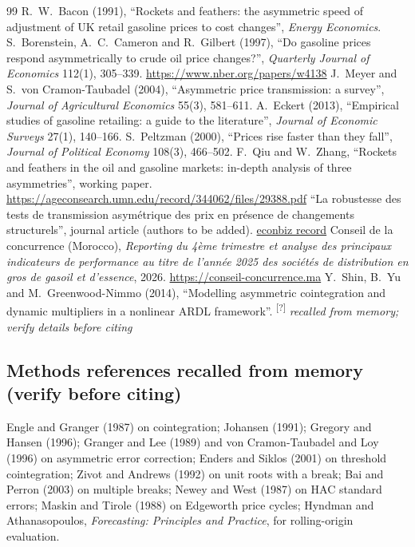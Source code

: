 \documentclass[11pt,a4paper]{article}
\theoremstyle{definition}
\begin{document}
\begin{thebibliography}{99}\small
{} R.~W.~Bacon (1991), ``Rockets and feathers: the asymmetric speed of adjustment of UK retail gasoline prices to cost changes'', \emph{Energy Economics}.
 S.~Borenstein, A.~C.~Cameron and R.~Gilbert (1997), ``Do gasoline prices respond asymmetrically to crude oil price changes?'', \emph{Quarterly Journal of Economics} 112(1), 305--339. \url{https://www.nber.org/papers/w4138}
 J.~Meyer and S.~von Cramon-Taubadel (2004), ``Asymmetric price transmission: a survey'', \emph{Journal of Agricultural Economics} 55(3), 581--611.
 A.~Eckert (2013), ``Empirical studies of gasoline retailing: a guide to the literature'', \emph{Journal of Economic Surveys} 27(1), 140--166.
 S.~Peltzman (2000), ``Prices rise faster than they fall'', \emph{Journal of Political Economy} 108(3), 466--502.
 F.~Qiu and W.~Zhang, ``Rockets and feathers in the oil and gasoline markets: in-depth analysis of three asymmetries'', working paper. \url{https://ageconsearch.umn.edu/record/344062/files/29388.pdf}
 ``La robustesse des tests de transmission asym\'etrique des prix en pr\'esence de changements structurels'', journal article (authors to be added). \href{https://www.econbiz.de/Record/la-robustesse-des-tests-de-transmission-asym%C3%A9trique-des-prix-en-pr%C3%A9sence-de-changements-structurels/10008604344}{econbiz record}
 Conseil de la concurrence (Morocco), \emph{Reporting du 4\`eme trimestre et analyse des principaux indicateurs de performance au titre de l'ann\'ee 2025 des soci\'et\'es de distribution en gros de gasoil et d'essence}, 2026. \url{https://conseil-concurrence.ma}
 Y.~Shin, B.~Yu and M.~Greenwood-Nimmo (2014), ``Modelling asymmetric cointegration and dynamic multipliers in a nonlinear ARDL framework''. \textsuperscript{\textcolor{red!70!black}{[?]}} \emph{recalled from memory; verify details before citing}
\end{thebibliography}

\subsection*{Methods references recalled from memory (verify before citing)}
\small
Engle and Granger (1987) on cointegration; Johansen (1991); Gregory and Hansen (1996); Granger and Lee (1989) and von Cramon-Taubadel and Loy (1996) on asymmetric error correction; Enders and Siklos (2001) on threshold cointegration; Zivot and Andrews (1992) on unit roots with a break; Bai and Perron (2003) on multiple breaks; Newey and West (1987) on HAC standard errors; Maskin and Tirole (1988) on Edgeworth price cycles; Hyndman and Athanasopoulos, \emph{Forecasting: Principles and Practice}, for rolling-origin evaluation.
\end{document}
